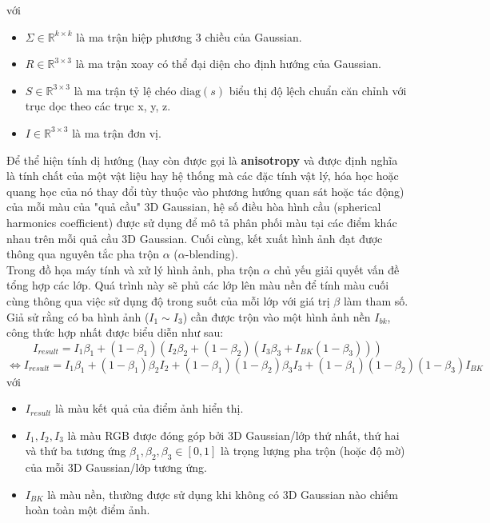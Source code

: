         với 
        \begin{itemize}
            \item $\Sigma \in \mathbb{R}^{k \times k}$ là ma trận hiệp phương 3 chiều của Gaussian.
            \item $R \in \mathbb{R}^{3 \times 3}$ là ma trận xoay có thể đại diện cho định hướng của Gaussian.
            \item $S \in \mathbb{R}^{3 \times 3}$ là ma trận tỷ lệ chéo $\text{diag}(s)$ biểu thị độ lệch chuẩn căn chỉnh với trục dọc theo các trục x, y, z.
            \item $I \in \mathbb{R}^{3 \times 3}$ là ma trận đơn vị.
        \end{itemize}

        Để thể hiện tính dị hướng (hay còn được gọi là \textbf{anisotropy} và được định nghĩa là tính chất của một vật liệu hay hệ thống mà các đặc tính vật lý, hóa học hoặc quang học của nó thay đổi tùy thuộc vào phương hướng quan sát hoặc tác động) của mỗi màu của "quả cầu" 3D Gaussian, hệ số điều hòa hình cầu (spherical harmonics coefficient) được sử dụng để mô tả phân phối màu tại các điểm khác nhau trên mỗi quả cầu 3D Gaussian. Cuối cùng, kết xuất hình ảnh đạt được thông qua nguyên tắc pha trộn $\alpha$ ($\alpha$-blending). \\
        
        Trong đồ họa máy tính và xử lý hình ảnh, pha trộn $\alpha$ chủ yếu giải quyết vấn đề tổng hợp các lớp. Quá trình này sẽ phủ các lớp lên màu nền để tính màu cuối cùng thông qua việc sử dụng độ trong suốt của mỗi lớp với giá trị $\beta$ làm tham số. Giả sử rằng có ba hình ảnh ($I_1 \sim I_3$) cần được trộn vào một hình ảnh nền $ I_ {bk} $, công thức hợp nhất được biểu diễn như sau:
        $$I_{result} = I_1  \beta_1 + (1 - \beta_1)(I_2  \beta_2 + (1-\beta_2)(I_3\beta_3 +I_{BK} (1-\beta_3)))$$
        $$\Leftrightarrow I_{result} = I_1 \beta_1 + (1-\beta_1)\beta_2I_2 + (1-\beta_1)(1-\beta_2)\beta_3I_3 + (1-\beta_1)(1-\beta_2)(1-\beta_3)I_{BK}$$
        với
        \begin{itemize}
            \item $I_{result}$ là màu kết quả của điểm ảnh hiển thị.
            \item $ I_1, I_2, I_3 $ là màu RGB được đóng góp bởi 3D Gaussian/lớp thứ nhất, thứ hai và thứ ba tương ứng $ \beta_1, \beta_2, \beta_3 \in [0, 1] $ là trọng lượng pha trộn (hoặc độ mờ) của mỗi 3D Gaussian/lớp tương ứng.
            \item $I_{BK}$ là màu nền, thường được sử dụng khi không có 3D Gaussian nào chiếm hoàn toàn một điểm ảnh.
        \end{itemize}

